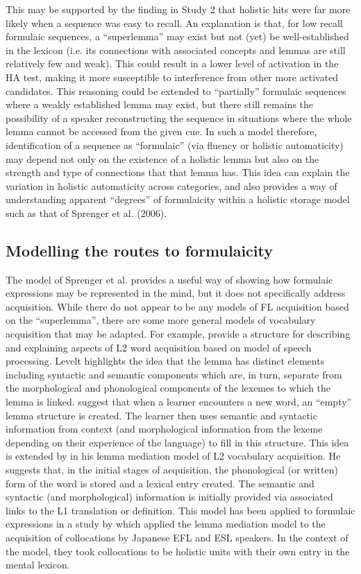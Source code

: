 \documentclass[output=paper]{langscibook}
\begin{document}
This may be supported by the finding in Study 2 that holistic hits were far more likely when a sequence was easy to recall. An explanation is that, for low recall formulaic sequences, a ``superlemma'' may exist but not (yet) be well-established in the lexicon (i.e. its connections with associated concepts and lemmas are still relatively few and weak). This could result in a lower level of activation in the HA test, making it more susceptible to interference from other more activated candidates. This reasoning could be extended to ``partially'' formulaic sequences where a weakly established lemma may exist, but there still remains the possibility of a speaker reconstructing the sequence in situations where the whole lemma cannot be accessed from the given cue. In such a model therefore, identification of a sequence as ``formulaic'' (via fluency or holistic automaticity) may depend not only on the existence of a holistic lemma but also on the strength and type of connections that that lemma has. This idea can explain the variation in holistic automaticity across categories, and also provides a way of understanding apparent ``degrees'' of formulaicity within a holistic storage model such as that of Sprenger et al. (2006). 

\subsection{Modelling the routes to formulaicity}
The model of Sprenger et al. provides a useful way of showing how formulaic expressions may be represented in the mind, but it does not specifically address acquisition. While there do not appear to be any models of FL acquisition based on the ``superlemma'', there are some more general models of vocabulary acquisition that may be adapted. For example, \citet{DeBotEtAl1997} provide a structure for describing and explaining aspects of L2 word acquisition based on  model of speech processing. Levelt highlights the idea that the lemma has distinct elements including syntactic and semantic components which are, in turn, separate from the morphological and phonological components of the lexemes to which the lemma is linked. \citet{DeBotEtAl1997} suggest that when a learner encounters a new word, an ``empty'' lemma structure is created. The learner then uses semantic and syntactic information from context (and morphological information from the lexeme depending on their experience of the language) to fill in this structure. This idea is extended by \citet{Jiang2000} in his lemma mediation model of L2 vocabulary acquisition. He suggests that, in the initial stages of acquisition, the phonological (or written) form of the word is stored and a lexical entry created. The semantic and syntactic (and morphological) information is initially provided via associated links to the L1 translation or definition. This model has been applied to formulaic expressions in a study by \citet{YamashitaJiang2010} which applied the lemma mediation model to the acquisition of collocations by Japanese EFL and ESL speakers. In the context of the model, they took collocations to be holistic units with their own entry in the mental lexicon.
\end{document}
